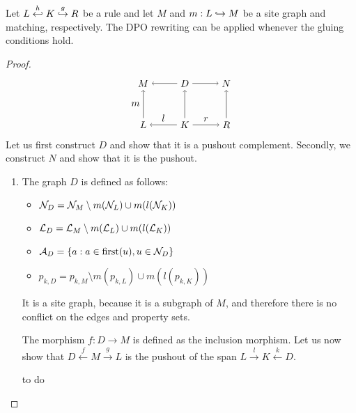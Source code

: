 \begin{lemma}
  Let $L\overset{h}{\hookleftarrow} K \overset{g}{\hookrightarrow} R$ be a rule and let $M$ and $m:L\hookrightarrow M$ be a site graph and matching, respectively. The DPO rewriting can be applied whenever the gluing conditions hold.
\end{lemma}
\begin{proof}
  \[
  \begin{tikzpicture} %
    \node (l) at (-1.5,0) {\(L\)};
    \node (d) at (0,0) {\(K\)};
    \node (r) at (1.5,0) {\(R\)};
    \node (m) at (-1.5,1.5) {\(M\)};
    \node (d') at (0,1.5) {\(D\)};
    \node (n) at (1.5,1.5) {\(N\)};
    \draw [->] (d) -- node [above,midway] {\(l\)} (l);
    \draw [->] (d) -- node [above,midway] {\(r\)} (r);
    \draw [->] (d') -- (m);
    \draw [->] (d') -- (n);
    \draw [->] (l) -- node [left,midway] {\(m\)}  (m);
    \draw [->] (d) -- (d');
    \draw [->] (r) -- (n);
  \end{tikzpicture}
  \]
  Let us first construct $D$ and show that it is a pushout complement. Secondly, we construct $N$ and show that it is the pushout.
  \begin{enumerate}
  \item The graph $D$ is defined as follows:
    \begin{itemize}
    \item $\mathcal{N}_D = \mathcal{N}_M\setminus m(\mathcal{N}_L) \cup m(l(\mathcal{N}_K))$
    \item $\mathcal{L}_D = \mathcal{L}_M\setminus m(\mathcal{L}_L) \cup m(l(\mathcal{L}_K))$
    \item $\mathcal{A}_D = \{a: a\in \text{first}(u), u\in\mathcal{N}_D\}$
    \item $p_{k,D} = p_{k,M}\setminus m(p_{k,L}) \cup m(l(p_{k,K}))$
    \end{itemize}
    It is a site graph, because it is a subgraph of $M$, and therefore there is no conflict on the edges and property sets.

    The morphism $f:D\to M$ is defined as the inclusion morphism.
    Let us now show that $D\overset{f}{\leftarrow}M\overset{g}{\rightarrow} L$ is the pushout of the span $L\overset{l}{\rightarrow}K\overset{k}{\leftarrow} D$.
 \begin{mdframed}[backgroundcolor=blue!20]
    to do
  \end{mdframed}


\end{enumerate}
\end{proof}
